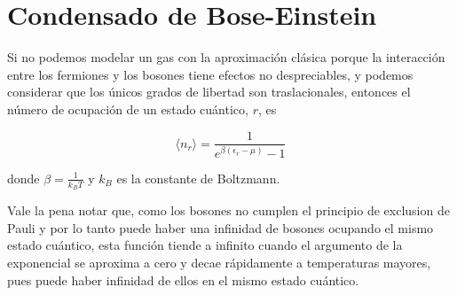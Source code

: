 \documentclass{article}
\begin{document}
  \section{Condensado de Bose-Einstein}
  
  Si no podemos modelar un gas con la aproximación clásica
  porque la interacción entre los fermiones y los bosones
  tiene efectos no despreciables, y podemos considerar que
  los únicos grados de libertad son traslacionales, entonces
  el número de ocupación de un estado cuántico, $r$, es
  
  \[\langle n_{r} \rangle = \frac{1}{e^{\beta \left(\epsilon_{r} - \mu \right)} - 1} \]
  
  donde $\beta = \frac{1}{k_{B} T}$  y $k_{B}$  es
  la constante de Boltzmann.
  
  Vale la pena notar que, como los bosones no cumplen el principio
  de exclusion de Pauli y por lo tanto puede haber una infinidad
  de bosones ocupando el mismo estado cuántico, esta función tiende
  a infinito cuando el argumento de la exponencial se aproxima a cero
  y decae rápidamente a temperaturas mayores, pues puede haber
  infinidad de ellos en el mismo estado cuántico.
\end{document}
